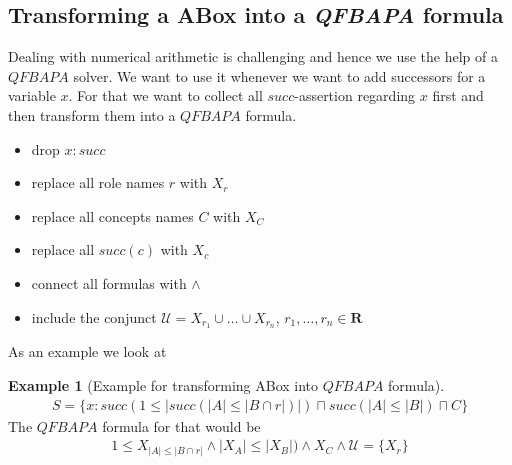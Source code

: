 \documentclass[a4paper,11pt]{scrartcl}
\theoremstyle{break}
\theoremstyle{definition}
\newtheorem{ex}{Example}
\begin{document}
\subsection{Transforming a ABox into a \textit{QFBAPA} formula}
Dealing with numerical arithmetic is challenging and hence we use the help of a $QFBAPA$ solver. We want to use it whenever we want to add successors for a variable $x$. For that we want to collect all $succ$-assertion regarding $x$ first and then transform them into a $QFBAPA$ formula.
\begin{itemize}
\item drop $x:succ$
\item replace all role names $r$ with $X_r$
\item replace all concepts names $C$ with $X_C$
\item replace all $succ(c)$ with $X_{c}$
\item connect all formulas with $\wedge$
\item include the conjunct $\mathcal{U}=X_{r_1}\cup\dots\cup X_{r_n}$, $r_1,\dots, r_n\in\mathbf{R}$
\end{itemize}
As an example we look at
\begin{ex}[Example for transforming ABox into $QFBAPA$ formula]
\begin{align*}
S=\{x:succ(1\leq|succ(|A|\leq|B\cap r|)|)\sqcap succ(|A|\leq |B|)\sqcap C\}
\end{align*}
The $QFBAPA$ formula for that would be
\begin{align*}
1\leq X_{|A|\leq|B\cap r|}\wedge|X_A|\leq |X_B|)\wedge X_C\wedge \mathcal{U}=\{X_r\}
\end{align*}
\end{ex}
\end{document}
